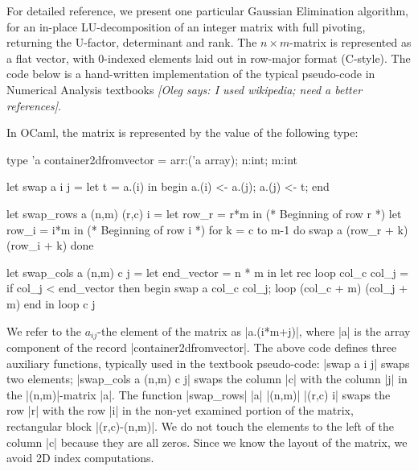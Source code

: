 \documentclass{elsart}
\newcommand{\oleg}[1]{{\it [Oleg says: #1]}}
\begin{document}
For detailed reference, we present one particular Gaussian Elimination
algorithm, for an in-place LU-decomposition of an integer matrix with
full pivoting, returning the U-factor, determinant and rank. The
$n\times m$-matrix is represented as a flat vector, with 0-indexed
elements laid out in row-major format (C-style). The code below is
a hand-written implementation of the typical pseudo-code in
Numerical Analysis textbooks \oleg{I used wikipedia; need a better references}.

In OCaml, the matrix is represented by the value of the following type:
\begin{code}
type 'a container2dfromvector = {arr:('a array); n:int; m:int}

let swap a i j =
    let t = a.(i) in begin a.(i) <- a.(j); a.(j) <- t; end

let swap_rows a (n,m) (r,c) i =
  let row_r = r*m in                    (* Beginning of row r *)
  let row_i = i*m in                    (* Beginning of row i *)
  for k = c to m-1 do
      swap a (row_r + k) (row_i + k)
  done

let swap_cols a (n,m) c j =
  let end_vector = n * m in
  let rec loop col_c col_j =
    if col_j < end_vector then
      begin
        swap a col_c col_j;
        loop (col_c + m) (col_j + m)
      end
  in loop c j
\end{code}
We refer to the $a_{ij}$-the element of the matrix as |a.(i*m+j)|,
where |a| is the array component of the record |container2dfromvector|.
The above code defines three auxiliary functions, typically used in the
textbook pseudo-code: |swap a i j| swaps two elements; 
|swap_cols a (n,m) c j| swaps the column |c| with the column |j| in
the |(n,m)|-matrix |a|. The function 
|swap_rows| |a| |(n,m)| |(r,c) i| swaps the row |r| with the row |i| in 
the non-yet examined portion of the matrix, 
rectangular block |(r,c)-(n,m)|. We do not touch the 
elements to the left of the column |c| because they are all zeros. 
Since we know the layout of the matrix, we avoid 2D index
computations.
\end{document}
